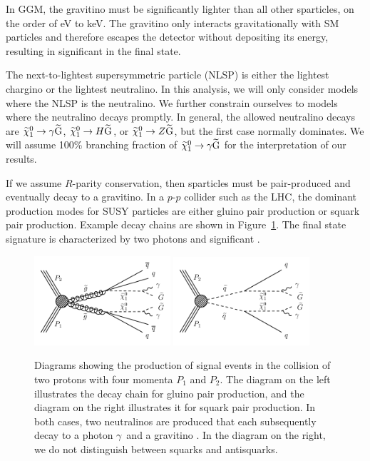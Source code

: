 In GGM, the gravitino must be significantly lighter than all other sparticles, on the order of eV to keV. The gravitino only interacts
gravitationally with SM particles and therefore escapes the detector without depositing its energy, resulting in 
significant \ETmiss in the final state.

The next-to-lightest supersymmetric particle (NLSP) is either the lightest chargino or the lightest neutralino.
In this analysis, we will only consider models where the NLSP is the neutralino. We further constrain 
ourselves to models where the neutralino decays promptly. In general, the allowed neutralino decays are
$\widetilde{\chi}^{0}_{1} \rightarrow \gamma\widetilde{\mathrm{G}}$, $\widetilde{\chi}^{0}_{1} \rightarrow H\widetilde{\mathrm{G}}$, or $\widetilde{\chi}^{0}_{1} \rightarrow Z\widetilde{\mathrm{G}}$,
but the first case normally dominates. We will assume 100\% branching fraction of $\widetilde{\chi}^{0}_{1} \rightarrow \gamma\widetilde{\mathrm{G}}$
for the interpretation of our results.

If we assume $R$-parity conservation, then sparticles must be pair-produced and eventually decay to a gravitino. 
In a $p$-$p$ collider such as the LHC, the dominant production modes for SUSY particles are either gluino pair production
or squark pair production. Example decay chains are shown in Figure~\ref{fig:gluinoSquarkDecay1}. The final state 
signature is characterized by two photons and significant \ETmiss.

\begin{figure}[htbp]
    \centering
    \includegraphics[width=0.45\textwidth]{Figures/Results/gluinoDecay.pdf}
    \includegraphics[width=0.45\textwidth]{Figures/Results/squarkDecay.pdf}
    \caption{Diagrams showing the production of signal events in the collision
        of two protons with four momenta ${P}_{1}$ and ${P}_{2}$. 
        The diagram on the left illustrates the decay chain for gluino pair production, and 
        the diagram on the right illustrates it for squark pair production. In both cases, 
        two neutralinos \neutralino are produced that each subsequently decay to a photon $\gamma$~and a gravitino \gravitino.
        In the diagram on the right, we do not distinguish between squarks and
        antisquarks.}
    \label{fig:gluinoSquarkDecay1}
\end{figure}

